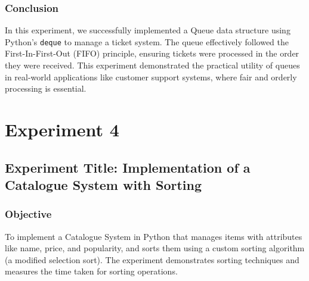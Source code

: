 \documentclass[a4paper,12pt]{article}
\begin{document}
\subsubsection*{Conclusion}
In this experiment, we successfully implemented a Queue data structure using Python's \texttt{deque} to manage a ticket system. The queue effectively followed the First-In-First-Out (FIFO) principle, ensuring tickets were processed in the order they were received. This experiment demonstrated the practical utility of queues in real-world applications like customer support systems, where fair and orderly processing is essential.

\clearpage

\section*{ Experiment 4}
\label{sec:exp4}
\subsection*{Experiment Title: Implementation of a Catalogue System with Sorting}

\subsubsection*{Objective}
To implement a Catalogue System in Python that manages items with attributes like name, price, and popularity, and sorts them using a custom sorting algorithm (a modified selection sort). The experiment demonstrates sorting techniques and measures the time taken for sorting operations.
\end{document}
